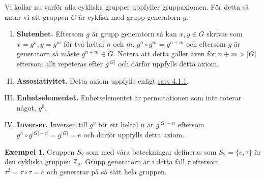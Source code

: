 \documentclass{article}
\theoremstyle{definition}
\newtheorem{exmp}[thm]{Exempel}
\begin{document}
Vi kollar nu varför alla cykliska grupper uppfyller gruppaxiomen. För detta så antar vi 
att gruppen $G$ är cyklisk med grupp generatorn $g$.
\begin{enumerate}[I)]
  \item \textbf{Slutenhet.} Eftersom $g$ är grupp generatorn så kan 
  $x, y \in G$ skrivas som $x = g^n, y = g^m$ för två heltal $n$ och $m$. 
  $g^n \circ g^m = g^{n + m}$ och eftersom 
  $g$ är generatorn så måste $g^{n+m} \in G$. Notera att detta gäller även för $n+m > |G|$ eftersom 
  allt repeteras efter $g^{|G|}$ och därför uppfylls detta axiom.
  \item \textbf{Assosiativitet.} Detta axiom uppfylls enligt \hyperlink{ass}{sats 4.1.1}.
  \item \textbf{Enhetselementet.} Enhetselementet är permutationen som inte roterar något,
  $g^0.$
  \item \textbf{Inverser.} Inversen till $g^n$ för ett heltal $n$ är $g^{|G|-n}$ eftersom 
  $g^{n} \circ g^{|G|-n} = g^{|G|} = e$ och därför uppfylls detta axiom.
\end{enumerate}

\begin{exmp}
  Gruppen $S_2$ som med våra beteckningar defineras som $S_2 = \{e, \tau\}$ är 
  den cykliska gruppen $\mathbb{Z}_2$. Grupp generatorn är i detta fall 
  $\tau$ eftersom $\tau^2 = \tau \circ \tau = e$
  och genererar på så sätt hela gruppen.
\end{exmp}
\end{document}
